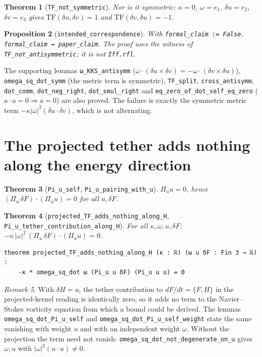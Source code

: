 \documentclass[11pt]{article}
\newtheorem{theorem}{Theorem}
\newtheorem{proposition}[theorem]{Proposition}
\theoremstyle{definition}
\theoremstyle{remark}
\newtheorem{remark}[theorem]{Remark}
\newcommand{\lean}[1]{\texttt{\upshape #1}}
\newcommand{\TF}{\mathrm{TF}}
\begin{document}
\begin{theorem}[\lean{TF_not_symmetric}]
Nor is it symmetric: $\kappa=0$, $\omega=e_1$, $\delta u=e_2$, $\delta v=e_3$
gives $\TF(\delta u,\delta v)=1$ and $\TF(\delta v,\delta u)=-1$.
\end{theorem}

\begin{proposition}[\lean{intended_correspondence}]
With \lean{formal_claim := False}, \lean{formal_claim ↔ paper_claim}. The
proof uses the witness of \lean{TF_not_antisymmetric}; it is not
\lean{Iff.rfl}.
\end{proposition}

The supporting lemmas \lean{ω_KKS_antisymm}
($\omega\cdot(\delta u\times\delta v)=-\omega\cdot(\delta v\times\delta u)$),
\lean{omega_sq_dot_symm} (the metric term is symmetric), \lean{TF_split},
\lean{cross_antisymm}, \lean{dot_comm}, \lean{dot_neg_right},
\lean{dot_smul_right} and \lean{eq_zero_of_dot_self_eq_zero} ($a\cdot a=0\Rightarrow a=0$)
are also proved. The failure is exactly the symmetric metric term
$-\kappa|\omega|^2(\delta u\cdot\delta v)$, which is not alternating.

\section{The projected tether adds nothing along the energy direction}
\begin{theorem}[\lean{Pi_u_self}, \lean{Pi_u_pairing_with_u}]
$\Pi_u u=0$, hence $(\Pi_u\,\delta F)\cdot(\Pi_u u)=0$ for all $u,\delta F$.
\end{theorem}
\begin{theorem}[\lean{projected_TF_adds_nothing_along_H}, \lean{Pi_u_tether_contribution_along_H}]
For all $\kappa,\omega,u,\delta F$:
$-\kappa\,|\omega|^2\,(\Pi_u\,\delta F)\cdot(\Pi_u u)=0$.
\begin{Verbatim}[fontsize=\small]
theorem projected_TF_adds_nothing_along_H (κ : ℝ) (ω u δF : Fin 3 → ℝ) :
    -κ * omega_sq_dot ω (Pi_u u δF) (Pi_u u u) = 0
\end{Verbatim}
\end{theorem}
\begin{remark}
With $\delta H=u$, the tether contribution to $dF/dt=\{F,H\}$ in the
projected-kernel reading is identically zero, so it adds no term to the
Navier--Stokes vorticity equation from which a bound could be derived. The
lemmas \lean{omega_sq_dot_Pi_u_self} and \lean{omega_sq_dot_Pi_u_self_weight}
state the same vanishing with weight $u$ and with an independent weight
$\omega$. Without the projection the term need not vanish:
\lean{omega_sq_dot_not_degenerate_on_u} gives $\omega,u$ with
$|\omega|^2(u\cdot u)\neq0$.
\end{remark}
\end{document}
